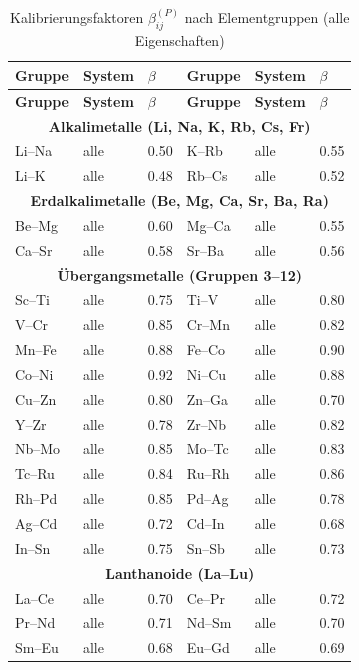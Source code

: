 \documentclass[12pt,a4paper]{article}
\begin{document}
	\begin{longtable}{p{2.5cm} p{2.5cm} p{1.2cm} p{2.5cm} p{2.5cm} p{1.2cm}}
		\caption{Kalibrierungsfaktoren $\beta_{ij}^{(P)}$ nach Elementgruppen (alle Eigenschaften)}\label{tab:beta_group}\\
		\toprule
		\textbf{Gruppe} & \textbf{System} & $\beta$ & \textbf{Gruppe} & \textbf{System} & $\beta$ \\
		\midrule
		\endfirsthead
		\toprule
		\textbf{Gruppe} & \textbf{System} & $\beta$ & \textbf{Gruppe} & \textbf{System} & $\beta$ \\
		\midrule
		\endhead
		\multicolumn{6}{c}{\textbf{Alkalimetalle (Li, Na, K, Rb, Cs, Fr)}} \\
		Li–Na & alle & 0.50 & K–Rb & alle & 0.55 \\
		Li–K  & alle & 0.48 & Rb–Cs & alle & 0.52 \\
		\multicolumn{6}{c}{\textbf{Erdalkalimetalle (Be, Mg, Ca, Sr, Ba, Ra)}} \\
		Be–Mg & alle & 0.60 & Mg–Ca & alle & 0.55 \\
		Ca–Sr & alle & 0.58 & Sr–Ba & alle & 0.56 \\
		\multicolumn{6}{c}{\textbf{Übergangsmetalle (Gruppen 3–12)}} \\
		Sc–Ti & alle & 0.75 & Ti–V & alle & 0.80 \\
		V–Cr  & alle & 0.85 & Cr–Mn & alle & 0.82 \\
		Mn–Fe & alle & 0.88 & Fe–Co & alle & 0.90 \\
		Co–Ni & alle & 0.92 & Ni–Cu & alle & 0.88 \\
		Cu–Zn & alle & 0.80 & Zn–Ga & alle & 0.70 \\
		Y–Zr  & alle & 0.78 & Zr–Nb & alle & 0.82 \\
		Nb–Mo & alle & 0.85 & Mo–Tc & alle & 0.83 \\
		Tc–Ru & alle & 0.84 & Ru–Rh & alle & 0.86 \\
		Rh–Pd & alle & 0.85 & Pd–Ag & alle & 0.78 \\
		Ag–Cd & alle & 0.72 & Cd–In & alle & 0.68 \\
		In–Sn & alle & 0.75 & Sn–Sb & alle & 0.73 \\
		\multicolumn{6}{c}{\textbf{Lanthanoide (La–Lu)}} \\
		La–Ce & alle & 0.70 & Ce–Pr & alle & 0.72 \\
		Pr–Nd & alle & 0.71 & Nd–Sm & alle & 0.70 \\
		Sm–Eu & alle & 0.68 & Eu–Gd & alle & 0.69 \\

\end{longtable}
\end{document}
